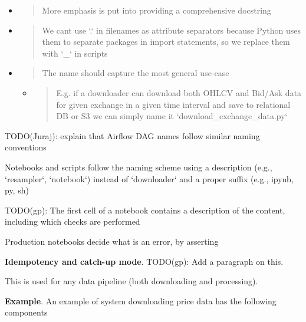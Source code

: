 \documentclass[11pt, reqno]{amsart}
\begin{document}
\begin{itemize}
\item
  \begin{quote}
  More emphasis is put into providing a comprehensive docstring
  \end{quote}
\item
  \begin{quote}
  We can\textquotesingle t use `.` in filenames as attribute separators
  because Python uses them to separate packages in import statements, so
  we replace them with `\_` in scripts
  \end{quote}
\item
  \begin{quote}
  The name should capture the most general use-case
  \end{quote}

  \begin{itemize}
  \item
    \begin{quote}
    E.g. if a downloader can download both OHLCV and Bid/Ask data for
    given exchange in a given time interval and save to relational DB or
    S3 we can simply name it `download\_exchange\_data.py`
    \end{quote}
  \end{itemize}
\end{itemize}

TODO(Juraj): explain that Airflow DAG names follow similar naming
conventions

Notebooks and scripts follow the naming scheme using a description
(e.g., `resampler`, `notebook`) instead of `downloader` and a proper
suffix (e.g., ipynb, py, sh)

TODO(gp): The first cell of a notebook contains a description of the
content, including which checks are performed

Production notebooks decide what is an error, by asserting

\textbf{Idempotency and catch-up mode}. TODO(gp): Add a paragraph on
this.

This is used for any data pipeline (both downloading and processing).

\textbf{Example}. An example of system downloading price data has the
following components
\end{document}

